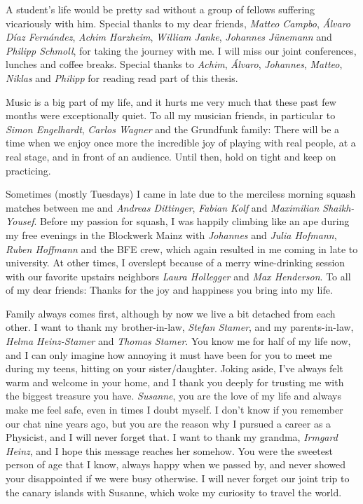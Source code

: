 A student's life would be pretty sad without a group of fellows suffering vicariously with him.
Special thanks to my dear friends, {\it Matteo Campbo}, {\it Álvaro Díaz Fernández}, {\it Achim Harzheim}, {\it William Janke}, {\it Johannes Jünemann} and {\it Philipp Schmoll}, for taking the journey with me.
I will miss our joint conferences, lunches and coffee breaks.
Special thanks to {\it Achim}, {\it Álvaro}, {\it Johannes}, {\it Matteo}, {\it Niklas} and {\it Philipp} for reading read part of this thesis.

Music is a big part of my life, and it hurts me very much that these past few months were exceptionally quiet.
To all my musician friends, in particular to {\it Simon Engelhardt}, {\it Carlos Wagner} and the Grundfunk family:
There will be a time when we enjoy once more the incredible joy of playing with real people, at a real stage, and in front of an audience.
Until then, hold on tight and keep on practicing.

Sometimes (mostly Tuesdays) I came in late due to the merciless morning squash matches between me and {\it Andreas Dittinger}, {\it Fabian Kolf} and {\it Maximilian Shaikh-Yousef}.
Before my passion for squash, I was happily climbing like an ape during my free evenings in the Blockwerk Mainz with {\it Johannes} and {\it Julia Hofmann}, {\it Ruben Hoffmann} and the BFE crew, which again resulted in me coming in late to university.
At other times, I overslept because of a merry wine-drinking session with our favorite upstairs neighbors {\it Laura Hollegger} and {\it Max Henderson}.
To all of my dear friends: Thanks for the joy and happiness you bring into my life.

Family always comes first, although by now we live a bit detached from each other.
I want to thank my brother-in-law, {\it Stefan Stamer}, and my parents-in-law, {\it Helma Heinz-Stamer} and {\it Thomas Stamer}.
You know me for half of my life now, and I can only imagine how annoying it must have been for you to meet me during my teens, hitting on your sister/daughter.
Joking aside, I've always felt warm and welcome in your home, and I thank you deeply for trusting me with the biggest treasure you have.
{\it Susanne}, you are the love of my life and always make me feel safe, even in times I doubt myself.
I don't know if you remember our chat nine years ago, but you are the reason why I pursued a career as a Physicist, and I will never forget that.
I want to thank my grandma, {\it Irmgard Heinz}, and I hope this message reaches her somehow.
You were the sweetest person of age that I know, always happy when we passed by, and never showed your disappointed if we were busy otherwise.
I will never forget our joint trip to the canary islands with Susanne, which woke my curiosity to travel the world.

